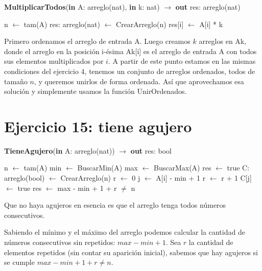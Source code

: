 \begin{algorithm}[H]
\caption{
    \textbf{MultiplicarTodos}(\textbf{in} A: arreglo(nat), \textbf{in} k: nat) $\to$ \textbf{out} res: arreglo(nat)
}
\begin{algorithmic}[1]
    \State n $\gets$ tam(A)
    \State res: arreglo(nat) $\gets$ CrearArreglo(n) 
     
        \State res[i] $\gets$ A[i] * k
    \EndFor
\end{algorithmic}
\end{algorithm}

Primero ordenamos el arreglo de entrada A. Luego creamos $k$ arreglos en Ak, donde el arreglo en la posición i-ésima Ak[i] es el arreglo de entrada A con todos sus elementos multiplicados por $i$. A partir de este punto estamos en las mismas condiciones del ejercicio 4, tenemos un conjunto de arreglos ordenados, todos de tamaño $n$, y queremos unirlos de forma ordenada. Así que aprovechamos esa solución y simplemente usamos la función UnirOrdenados.

\section{Ejercicio 15: tiene agujero}

\begin{algorithm}[H]
\caption{
    \textbf{TieneAgujero}(\textbf{in} A: arreglo(nat)) $\to$ \textbf{out} res: bool
}
\begin{algorithmic}[1]
    \State n $\gets$ tam(A) 
    \State min $\gets$ BuscarMin(A) 
    \State max $\gets$ BuscarMax(A) 
        \State res $\gets$ true
    \Else
        \State C: arreglo(bool) $\gets$ CrearArreglo(n) 
        \State r $\gets$ 0
         
            \State j $\gets$ A[i] - min + 1
                \State r $\gets$ r + 1
            \Else
                \State C[j] $\gets$ true
            \EndIf
        \EndFor
        \State res $\gets$ max - min + 1 + r $\neq$ n
    \EndIf
\end{algorithmic}
\end{algorithm}

Que no haya agujeros en esencia es que el arreglo tenga todos números consecutivos.

Sabiendo el mínimo y el máximo del arreglo podemos calcular la cantidad de números consecutivos sin repetidos: $max - min + 1$. Sea $r$ la cantidad de elementos repetidos (sin contar su aparición inicial), sabemos que hay agujeros si se cumple $max - min + 1 + r \neq n$.

